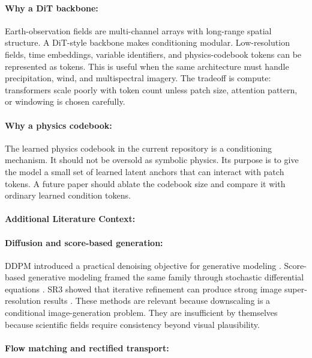 \documentclass{article}
\begin{document}
\paragraph{Why a DiT backbone:}

Earth-observation fields are multi-channel arrays with long-range spatial structure. A DiT-style backbone makes conditioning modular. Low-resolution fields, time embeddings, variable identifiers, and physics-codebook tokens can be represented as tokens. This is useful when the same architecture must handle precipitation, wind, and multispectral imagery. The tradeoff is compute: transformers scale poorly with token count unless patch size, attention pattern, or windowing is chosen carefully.

\paragraph{Why a physics codebook:}

The learned physics codebook in the current repository is a conditioning mechanism. It should not be oversold as symbolic physics. Its purpose is to give the model a small set of learned latent anchors that can interact with patch tokens. A future paper should ablate the codebook size and compare it with ordinary learned condition tokens.

\paragraph{Additional Literature Context:}

\paragraph{Diffusion and score-based generation:}

DDPM introduced a practical denoising objective for generative modeling \citep{ho2020denoising}. Score-based generative modeling framed the same family through stochastic differential equations \citep{song2021score}. SR3 showed that iterative refinement can produce strong image super-resolution results \citep{saharia2022image}. These methods are relevant because downscaling is a conditional image-generation problem. They are insufficient by themselves because scientific fields require consistency beyond visual plausibility.

\paragraph{Flow matching and rectified transport:}
\end{document}
